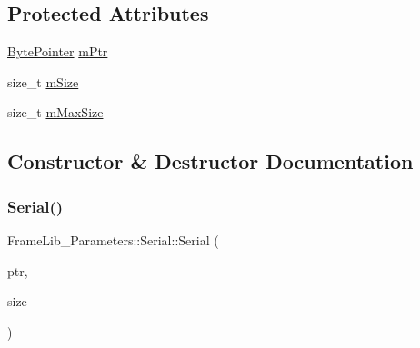 \subsection*{Protected Attributes}
\begin{DoxyCompactItemize}
\item 
\hyperlink{_frame_lib___types_8h_a2c5689a997a12479b7d925e565428141}{Byte\+Pointer} \hyperlink{class_frame_lib___parameters_1_1_serial_a28ea665fc997bfdef3947079505ece1f}{m\+Ptr}
\item 
size\+\_\+t \hyperlink{class_frame_lib___parameters_1_1_serial_a348d0da027db94981ccf75c939d46a98}{m\+Size}
\item 
size\+\_\+t \hyperlink{class_frame_lib___parameters_1_1_serial_abd8b4549cf121628d9f1f5ed518e6729}{m\+Max\+Size}
\end{DoxyCompactItemize}


\subsection{Constructor \& Destructor Documentation}
\mbox{\label{class_frame_lib___parameters_1_1_serial_a240eb02a38ab2e545c088f63df9f1851}} 
\subsubsection{\texorpdfstring{Serial()}{Serial()}\hspace{0.1cm}{\footnotesize\ttfamily [1/2]}}
{\footnotesize\ttfamily Frame\+Lib\+\_\+\+Parameters\+::\+Serial\+::\+Serial (\begin{DoxyParamCaption}\item[{\hyperlink{_frame_lib___types_8h_a2c5689a997a12479b7d925e565428141}{Byte\+Pointer}}]{ptr,  }\item[{size\+\_\+t}]{size }\end{DoxyParamCaption})}

\mbox{\label{class_frame_lib___parameters_1_1_serial_af433868e4f3db5ef6581e3aae7b430a6}} 
